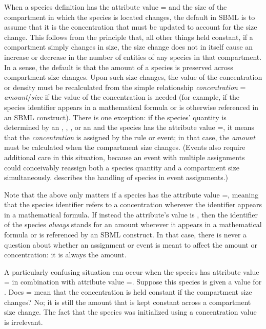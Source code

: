 When a species definition has the attribute value
= and the size of the
compartment in which the species is located changes, the default
in SBML is to assume that it is the concentration that must be
updated to account for the size change.  This follows from the
principle that, all other things held constant, if a compartment
simply changes in size, the size change does not in itself cause
an increase or decrease in the number of entities of any species
in that compartment.  In a sense, the default is that the amount
of a species is preserved across compartment size changes.  Upon
such size changes, the value of the concentration or density must
be recalculated from the simple relationship \emph{concentration}
= \emph{amount}/\emph{size} if the value of the concentration is
needed (for example, if the species identifier appears in a
mathematical formula or is otherwise referenced in an SBML
construct).  There is one exception: if the species' quantity is
determined by an \AssignmentRule, \RateRule, \AlgebraicRule, or an
\EventAssignment and the species has the attribute value
=, it means that the
\emph{concentration} is assigned by the rule or event; in that
case, the \emph{amount} must be calculated when the compartment
size changes.  (Events also require additional care in this
situation, because an event with multiple assignments could
conceivably reassign both a species quantity and a compartment
size simultaneously.   describes
the handling of species in event assignments.)

Note that the above only matters if a species has the attribute
value =, meaning that the
species identifier refers to a concentration wherever the
identifier appears in a mathematical formula.  If instead the
attribute's value is , then the identifier of the
species \emph{always} stands for an amount wherever it appears in
a mathematical formula or is referenced by an SBML construct.  In
that case, there is never a question about whether an assignment
or event is meant to affect the amount or concentration: it is
always the amount.

A particularly confusing situation can occur when the species has
attribute value = in combination with
attribute value =.
Suppose this species is given a value for
.  Does =
mean that the concentration is held constant if the compartment
size changes?  No; it is still the amount that is kept constant
across a compartment size change.  The fact that the species was
initialized using a concentration value is irrelevant.


